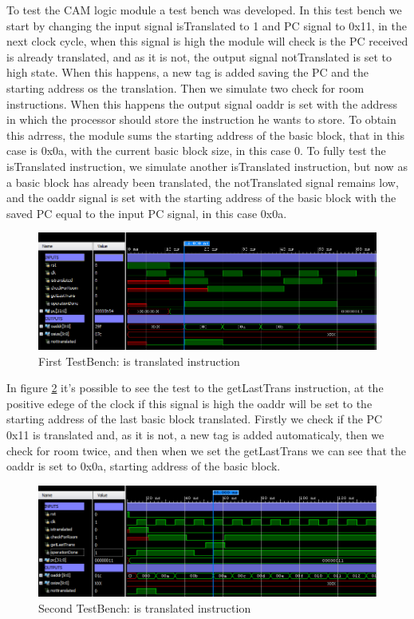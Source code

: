
To test the CAM logic module a test bench was developed. In this test bench we start by changing the input signal isTranslated to 1 and PC signal to 0x11, in the next clock cycle, when this signal is high the module will check is the PC received is already translated, and as it is not, the output signal notTranslated is set to high state. When this happens, a new tag is added saving the PC and the starting address os the translation.
Then we simulate two check for room instructions. When this happens the output signal oaddr is set with the address in which the processor should store the instruction he wants to store. To obtain this adrress, the module sums the starting address of the basic block, that in this case is 0x0a, with the current basic block size, in this case 0.
To fully test the isTranslated instruction, we simulate another isTranslated instruction, but now as a basic block has already been translated, the notTranslated signal remains low, and the oaddr signal is set with the starting address of the basic block with the saved PC equal to the input PC signal, in this case 0x0a.

\begin{figure} [H]
	\centering
	\includegraphics[scale = 0.5]{images/TestBench1.png}
	\caption{First TestBench: is translated instruction}
	\label{fig:TestBench1}
\end{figure}

In figure \ref{fig:TestBench4} it's possible to see the test to the getLastTrans instruction, at the positive edege of the clock if this signal is high the oaddr will be set to the starting address of the last basic block translated. Firstly we check if the PC 0x11 is translated and, as it is not, a new tag is added automaticaly, then we check for room twice, and then when we set the getLastTrans we can see that the oaddr is set to 0x0a, starting address of the basic block.

\begin{figure} [H]
	\centering
	\includegraphics[scale = 0.5]{images/TestBench4.png}
	\caption{Second TestBench: is translated instruction}
	\label{fig:TestBench4}
\end{figure}

